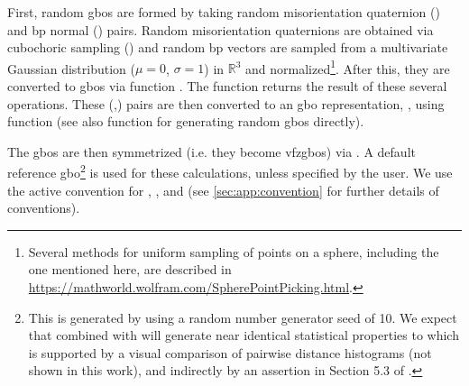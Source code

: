 \documentclass[final,twocolumn,12pt]{elsarticle}
\begin{document}
First, random \glspl{gbo} are formed by taking random misorientation quaternion () and \gls{bp} normal () pairs. Random misorientation quaternions are obtained via cubochoric sampling \cite{singhOrientationSamplingDictionarybased2016} () and random \gls{bp} vectors are sampled from a multivariate Gaussian distribution ($\mu=0$, $\sigma=1$) in $\mathbb{R}^3$ and normalized\footnote{Several methods for uniform sampling of points on a sphere, including the one mentioned here, are described in \url{https://mathworld.wolfram.com/SpherePointPicking.html}.}. After this, they are converted to \glspl{gbo} via \vfzorepo{} function . The \vfzorepo{} function  returns the result of these several operations. These (,) pairs are then converted to an \gls{gbo} representation, , using \vfzorepo{} function  (see also \vfzorepo{} function  for generating random \glspl{gbo} directly).

The \glspl{gbo} are then symmetrized (i.e. they become \glspl{vfzgbo}) via . A default reference \gls{gbo}\footnote{This is generated by  using a random number generator seed of 10. We expect that  combined with  will generate near identical statistical properties to  which is supported by a visual comparison of pairwise distance histograms (not shown in this work), and indirectly by an assertion in Section 5.3 of \citet{morawiecDistancesGrainInterfaces2019}. } is used for these calculations, unless specified by the user. We use the active convention for , , and  (see \cref{sec:app:convention} for further details of conventions).
\end{document}
